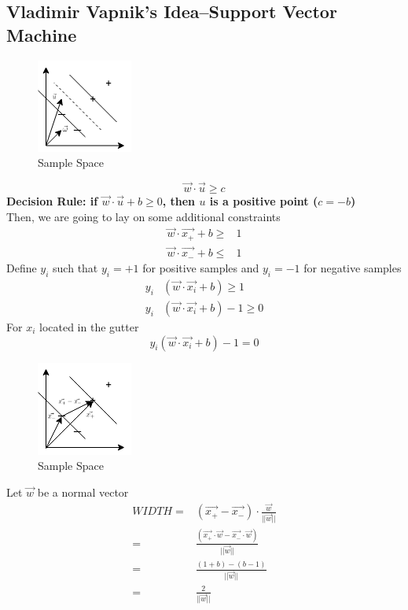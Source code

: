 \documentclass[12pt]{book}
\begin{document}
\subsection{Vladimir Vapnik's Idea--Support Vector Machine}
\begin{figure}[ht]
	\centering
	\includegraphics[scale=0.85]{Figure/Figure16_4.png}
	\caption{Sample Space}
\end{figure}
$$\boxed{\vec{w}\cdot \vec{u}\geq c}$$
\indent \textbf{Decision Rule: if $\vec{w}\cdot\vec{u}+b\geq 0$, then $u$ is a positive point ($c = - b$)}\\
\indent Then, we are going to lay on some additional constraints
\begin{equation*}
\begin{aligned}
\vec{w}\cdot \vec{x_+}+b \geq&1\\
\vec{w}\cdot \vec{x_-}+b \leq& 1
\end{aligned}
\end{equation*}
\indent Define $y_i$ such that $y_i=+1$ for positive samples and $y_i=-1$ for negative samples
\begin{equation*}
\begin{aligned}
y_i&(\vec{w}\cdot \vec{x_i}+b) \geq1\\
y_i&(\vec{w}\cdot \vec{x_i}+b) -1\geq 0
\end{aligned}
\end{equation*}
\indent For $x_i$ located in the gutter
$$\boxed{y_i(\vec{w}\cdot \vec{x_i}+b) -1= 0}$$
\newpage
\begin{figure}[ht]
	\centering
	\includegraphics[scale=0.85]{Figure/Figure16_5.png}
	\caption{Sample Space}
\end{figure}
\indent Let $\vec{w}$ be a normal vector
\begin{equation*}
\begin{aligned}
WIDTH = &(\vec{x_+}-\vec{x_-})\cdot \frac{\vec{w}}{||\vec{w}||}\\
=&\frac{(\vec{x_+}\cdot\vec{w}-\vec{x_-}\cdot\vec{w})}{||\vec{w}||}\\
=&\frac{(1+b)-(b-1)}{||\vec{w}||}\\
=&\frac{2}{||\vec{w}||}
\end{aligned}
\end{equation*}
\end{document}
